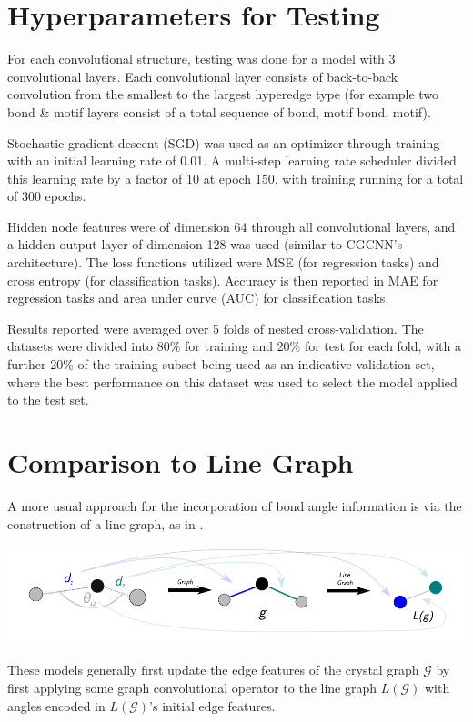 \documentclass[10pt,a4paper,twocolumn]{article}
\begin{document}
\section{Hyperparameters for Testing}\label{app:hyperparam}
For each convolutional structure, testing was done for a model with 3 convolutional layers. Each convolutional layer consists of back-to-back convolution from the smallest to the largest hyperedge type (for example two bond \& motif layers consist of a total sequence of bond, motif bond, motif). 

Stochastic gradient descent (SGD) was used as an optimizer through training with an initial learning rate of 0.01. A multi-step learning rate scheduler divided this learning rate by a factor of 10 at epoch 150, with training running for a total of 300 epochs.  

Hidden node features were of dimension 64 through all convolutional layers, and a hidden output layer of dimension 128 was used (similar to CGCNN's architecture). The loss functions utilized were MSE (for regression tasks) and cross entropy (for classification tasks). Accuracy is then reported in MAE for regression tasks and area under curve (AUC) for classification tasks. 

Results reported were averaged over 5 folds of nested cross-validation. The datasets were divided into 80\% for training and 20\% for test for each fold, with a further 20\% of the training subset being used as an indicative validation set, where the best performance on this dataset was used to select the model applied to the test set. 


\section{Comparison to Line Graph}
A more usual approach for the incorporation of bond angle information is via the construction of a line graph, as in \cite{alignn, m3gnet}. 
\begin{center}
\includegraphics[scale=0.38]{line_graph_ex.pdf}
\end{center}
These models generally first update the edge features of the crystal graph $\mathcal{G}$ by first applying some graph convolutional operator to the line graph $L(\mathcal{G})$ with angles encoded in  $L(\mathcal{G})$'s initial edge features.
\end{document}
